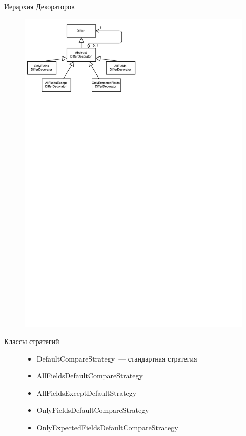 \documentclass{beamer}
\begin{document}
\begin{frame}{Иерархия Декораторов}
    \begin{figure}
        \begin{center}
            \includegraphics{decorator-diagram.pdf}
        \end{center}
    \end{figure}
\end{frame}

\begin{frame}{Классы стратегий}
    \begin{figure}
        \pause
        \begin{itemize}
            \item {DefaultCompareStrategy~--- стандартная стратегия \pause}
            \item {AllFieldsDefaultCompareStrategy \pause}
            \item {AllFieldsExceptDefaultStrategy \pause}
            \item {OnlyFieldsDefaultCompareStrategy \pause}
            \item {OnlyExpectedFieldsDefaultCompareStrategy}
        \end{itemize}
    \end{figure}
\end{frame}
\end{document}

